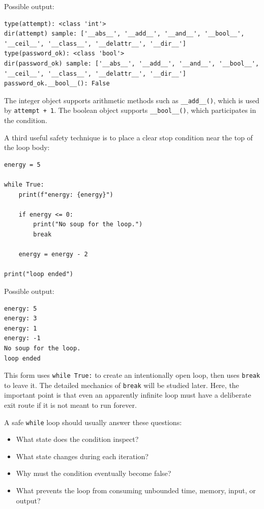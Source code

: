 Possible output:

\begin{verbatim}
type(attempt): <class 'int'>
dir(attempt) sample: ['__abs__', '__add__', '__and__', '__bool__', '__ceil__', '__class__', '__delattr__', '__dir__']
type(password_ok): <class 'bool'>
dir(password_ok) sample: ['__abs__', '__add__', '__and__', '__bool__', '__ceil__', '__class__', '__delattr__', '__dir__']
password_ok.__bool__(): False
\end{verbatim}

The integer object supports arithmetic methods such as \texttt{\_\_add\_\_()}, which is used by \texttt{attempt + 1}. The boolean object supports \texttt{\_\_bool\_\_()}, which participates in the condition.

A third useful safety technique is to place a clear stop condition near the top of the loop body:

\begin{verbatim}
energy = 5

while True:
    print(f"energy: {energy}")

    if energy <= 0:
        print("No soup for the loop.")
        break

    energy = energy - 2

print("loop ended")
\end{verbatim}

Possible output:

\begin{verbatim}
energy: 5
energy: 3
energy: 1
energy: -1
No soup for the loop.
loop ended
\end{verbatim}

This form uses \texttt{while True:} to create an intentionally open loop, then uses \texttt{break} to leave it. The detailed mechanics of \texttt{break} will be studied later. Here, the important point is that even an apparently infinite loop must have a deliberate exit route if it is not meant to run forever.

A safe \texttt{while} loop should usually answer these questions:

\begin{itemize}
    \item What state does the condition inspect?
    \item What state changes during each iteration?
    \item Why must the condition eventually become false?
    \item What prevents the loop from consuming unbounded time, memory, input, or output?
\end{itemize}


